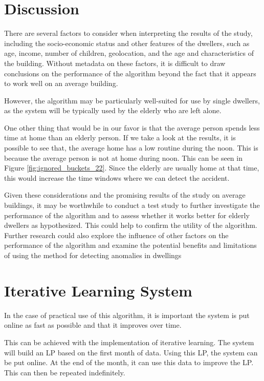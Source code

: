 \section{Discussion}

There are several factors to consider when interpreting the results of the study,
including the socio-economic status and other features of the dwellers, such as age, income, number of children, geolocation, and the age and characteristics of the building.
Without metadata on these factors, it is difficult to draw conclusions on the performance of the algorithm beyond the fact that it appears to work well on an average building.

However, the algorithm may be particularly well-suited for use by single dwellers,
as the system will be typically used by the elderly who are left alone.

One other thing that would be in our favor is that the average person spends less time at home than an elderly person. 
If we take a look at the results, it is possible to see that,
the average home has a low routine during the noon. 
This is because the average person is not at home during noon.
This can be seen in Figure \ref{fig:ignored_buckets_22}.
Since the elderly are usually home at that time, this would 
increase the time windows where we can detect the accident.

Given these considerations and the promising results of the study on average buildings,
it may be worthwhile to conduct a test study to further investigate the performance of the algorithm and to assess whether it works better for elderly dwellers as hypothesized.
This could help to confirm the utility of the algorithm.
Further research could also explore the influence of other factors on the performance of the algorithm and examine the potential benefits and limitations of using the method for detecting anomalies in dwellings

\section{Iterative Learning System}

In the case of practical use of this algorithm, it is 
important the system is put online as fast as possible and that it improves over time. 

This can be achieved with the implementation of iterative learning.
The system will build an LP based on the first month of data.
Using this LP, the system can be put online.
At the end of the month, it can use this data to improve the LP.
This can then be repeated indefinitely. 

